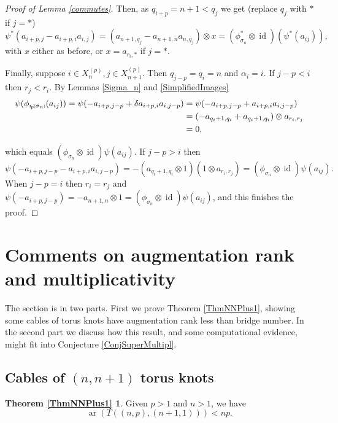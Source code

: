 \documentclass[11pt]{amsart}
\def\s{{\sigma}}
\def\a{\alpha}
\def\ar{\operatorname{ar}}
\newcommand*{\subsmallp}[1]{\scalebox{.5}{\ensuremath#1}}
\newcommand{\subpp}[2][p]{\imath_{\hspace*{-1pt}#1}\hspace*{-.5pt}\subsmallp(#2\subsmallp)}
\newcommand\id{\operatorname{id}}
\theoremstyle{definition}
\begin{document}
\begin{proof} [Proof of Lemma \ref{commutes}]
\noindent Then, as $q_{i+p} = n+1<q_j$ we get (replace $q_j$ with $\ast$ if $j=\ast$)
$$\psi^\ast(a_{i+p,j} - a_{i+p,i}a_{i,j}) = (a_{n+1,q_j} - a_{n+1,n}a_{n,q_j})\otimes x = (\phi^\ast_{\s_n} \otimes \id)(\psi^\ast(a_{ij})),$$
\noindent with $x$ either as before, or $x=a_{r_i,\ast}$ if $j=\ast$.

Finally, suppose $i\in X_n^{(p)},j\in X_{n+1}^{(p)}$. Then $q_{j-p}=q_i=n$ and $\a_i=i$. If $j-p<i$ then $r_j<r_i$. By Lemmas \ref{Sigma_n} and \ref{SimplifiedImages}
\begin{align*}
  \psi(\phi_{\subpp{\s_n}}(a_{ij})) = \psi(-a_{i+p,j-p}+\delta a_{i+p,i}a_{i,j-p})
            &= \psi(-a_{i+p,j-p}+a_{i+p,i}a_{i,j-p})\\
            &= (-a_{q_i+1,q_i}+a_{q_i+1,q_i})\otimes a_{r_i,r_j}\\
            &=0,
\end{align*}

\noindent which equals $(\phi_{\s_n}\otimes\id)\psi(a_{ij})$. If $j-p>i$ then 
  \[\psi(-a_{i+p,j-p}-a_{i+p,i}a_{i,j-p}) = -(a_{q_i+1,q_i}\otimes 1)(1\otimes a_{r_i,r_j}) = (\phi_{\s_n}\otimes\id)\psi(a_{ij}).\]
\noindent When $j-p=i$ then $r_i=r_j$ and $\psi(-a_{i+p,j-p}) = -a_{n+1,n}\otimes 1=(\phi_{\s_n}\otimes\id)\psi(a_{ij})$, and this finishes the proof.
\end{proof}


\section{Comments on augmentation rank and multiplicativity}
\label{SecComments}

The section is in two parts. First we prove Theorem \ref{ThmNNPlus1}, showing some cables of torus knots have augmentation rank less than bridge number. In the second part we discuss how this result, and some computational evidence, might fit into Conjecture \ref{ConjSuperMultipl}.

\subsection{Cables of $(n,n+1)$ torus knots}
\label{SecNNPlus1}

\newtheorem*{ThmNNPlus1}{Theorem \ref{ThmNNPlus1}}
\begin{ThmNNPlus1}Given $p>1$ and $n>1$, we have \[\ar(T((n,p),(n+1,1))) < np.\]
\end{ThmNNPlus1}
\end{document}
